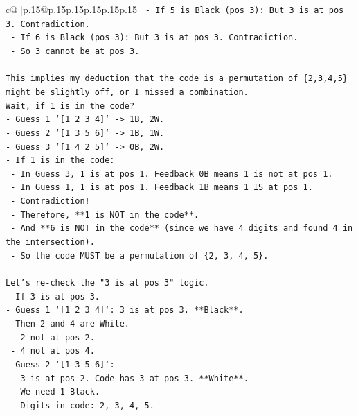 \documentclass{article}
\begin{document}
{\begin{supertabular}{c@{$\;$}|p{.15\linewidth}@{}p{.15\linewidth}p{.15\linewidth}p{.15\linewidth}p{.15\linewidth}p{.15\linewidth}}
{{{\texttt{        {-}   If 5 is Black (pos 3): But 3 is at pos 3. Contradiction.} \\
\texttt{        {-}   If 6 is Black (pos 3): But 3 is at pos 3. Contradiction.} \\
\texttt{    {-}   So 3 cannot be at pos 3.} \\
\\ 
\texttt{This implies my deduction that the code is a permutation of \{2,3,4,5\} might be slightly off, or I missed a combination.} \\
\texttt{Wait, if 1 is in the code?} \\
\texttt{{-}   Guess 1 `{[}1 2 3 4{]}` {-}> 1B, 2W.} \\
\texttt{{-}   Guess 2 `{[}1 3 5 6{]}` {-}> 1B, 1W.} \\
\texttt{{-}   Guess 3 `{[}1 4 2 5{]}` {-}> 0B, 2W.} \\
\texttt{{-}   If 1 is in the code:} \\
\texttt{    {-}   In Guess 3, 1 is at pos 1. Feedback 0B means 1 is not at pos 1.} \\
\texttt{    {-}   In Guess 1, 1 is at pos 1. Feedback 1B means 1 IS at pos 1.} \\
\texttt{    {-}   Contradiction!} \\
\texttt{    {-}   Therefore, **1 is NOT in the code**.} \\
\texttt{    {-}   And **6 is NOT in the code** (since we have 4 digits and found 4 in the intersection).} \\
\texttt{    {-}   So the code MUST be a permutation of \{2, 3, 4, 5\}.} \\
\\ 
\texttt{Let's re{-}check the "3 is at pos 3" logic.} \\
\texttt{{-}   If 3 is at pos 3.} \\
\texttt{{-}   Guess 1 `{[}1 2 3 4{]}`: 3 is at pos 3. **Black**.} \\
\texttt{{-}   Then 2 and 4 are White.} \\
\texttt{    {-}   2 not at pos 2.} \\
\texttt{    {-}   4 not at pos 4.} \\
\texttt{{-}   Guess 2 `{[}1 3 5 6{]}`:} \\
\texttt{    {-}   3 is at pos 2. Code has 3 at pos 3. **White**.} \\
\texttt{    {-}   We need 1 Black.} \\
\texttt{    {-}   Digits in code: 2, 3, 4, 5.} \\
}}}
\end{supertabular}}
\end{document}
